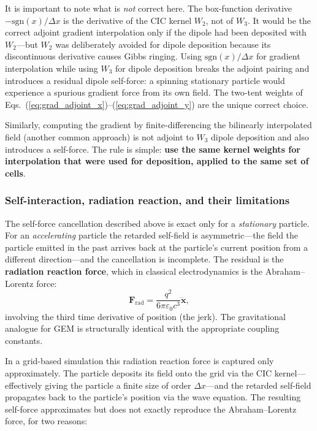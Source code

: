 \documentclass[11pt,a4paper]{article}
\newcommand{\vv}[1]{\mathbf{#1}}
\begin{document}
It is important to note what is \emph{not} correct here.  The box-function derivative $-\mathrm{sgn}(x)/\Delta x$ is the derivative of the CIC kernel $W_2$, not of $W_3$.  It would be the correct adjoint gradient interpolation only if the dipole had been deposited with $W_2$---but $W_2$ was deliberately avoided for dipole deposition because its discontinuous derivative causes Gibbs ringing.  Using $\mathrm{sgn}(x)/\Delta x$ for gradient interpolation while using $W_3$ for dipole deposition breaks the adjoint pairing and introduces a residual dipole self-force: a spinning stationary particle would experience a spurious gradient force from its own field.  The two-tent weights of Eqs.~(\ref{eq:grad_adjoint_x})--(\ref{eq:grad_adjoint_y}) are the unique correct choice.

Similarly, computing the gradient by finite-differencing the bilinearly interpolated field (another common approach) is not adjoint to $W_3$ dipole deposition and also introduces a self-force.  The rule is simple: \textbf{use the same kernel weights for interpolation that were used for deposition, applied to the same set of cells}.

\subsubsection*{Self-interaction, radiation reaction, and their limitations}

The self-force cancellation described above is exact only for a \emph{stationary} particle.  For an \emph{accelerating} particle the retarded self-field is asymmetric---the field the particle emitted in the past arrives back at the particle's current position from a different direction---and the cancellation is incomplete.  The residual is the \textbf{radiation reaction force}, which in classical electrodynamics is the Abraham--Lorentz force:
\begin{equation}
  \vv{F}_{\mathrm{rad}} = \frac{q^2}{6\pi\varepsilon_0 c^3}\dddot{\vv{x}},
\end{equation}
involving the third time derivative of position (the jerk).  The gravitational analogue for GEM is structurally identical with the appropriate coupling constants.

In a grid-based simulation this radiation reaction force is captured only approximately.  The particle deposits its field onto the grid via the CIC kernel---effectively giving the particle a finite size of order $\Delta x$---and the retarded self-field propagates back to the particle's position via the wave equation.  The resulting self-force approximates but does not exactly reproduce the Abraham--Lorentz force, for two reasons:
\end{document}
